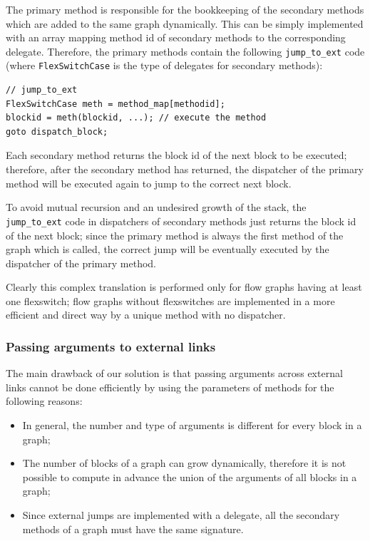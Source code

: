 The primary method is responsible for the bookkeeping of the secondary
methods which are added to the same graph dynamically. This can be 
simply implemented with an array mapping method id of secondary methods
to the corresponding delegate. Therefore, the primary methods contain
the following \lstinline{jump_to_ext} code (where
\lstinline{FlexSwitchCase} is the type of delegates for secondary methods):
\begin{small}
\begin{lstlisting}[language={[Sharp]C}] 
// jump_to_ext
FlexSwitchCase meth = method_map[methodid];
blockid = meth(blockid, ...); // execute the method
goto dispatch_block;
\end{lstlisting}
\end{small}
Each secondary method returns the block id of the next block to be
executed; therefore, after the secondary method has returned, the
dispatcher of the primary method will be executed again to jump
to the correct next block. 

To avoid mutual recursion and an undesired growth of the stack,
the \lstinline{jump_to_ext} code in dispatchers of secondary methods
just returns the block id of the next block; since the primary method
is always the first method of the graph which is called, the correct
jump will be eventually executed by the dispatcher of the primary method.

Clearly this complex translation is performed only for flow graphs
having at least one flexswitch; flow graphs without flexswitches
are implemented in a more efficient and direct way by a unique method
with no dispatcher.

\subsubsection{Passing arguments to external links}

The main drawback of our solution is that passing arguments across
external links cannot be done efficiently by using the parameters of
methods for the following reasons:
\begin{itemize}
\item In general, the number and type of arguments is different for every block in a graph;

\item The number of blocks of a graph can grow dynamically, therefore
  it is not possible to compute in advance the union of the arguments
  of all blocks in a graph; 

\item Since external jumps are implemented with a delegate, all the
  secondary methods of a graph must have the same signature.
\end{itemize}

